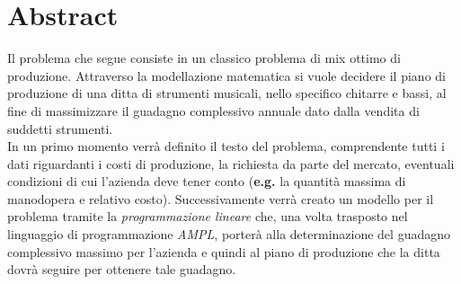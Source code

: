 \newpage
\section{Abstract}
Il problema che segue consiste in un classico problema di mix ottimo di produzione. Attraverso la modellazione matematica si vuole decidere il piano di produzione di una ditta di strumenti musicali, nello specifico chitarre e bassi, al fine di massimizzare il guadagno complessivo annuale dato dalla vendita di suddetti strumenti. \\ 
In un primo momento verrà definito il testo del problema, comprendente tutti i dati riguardanti i costi di produzione, la richiesta da parte del mercato, eventuali condizioni di cui l'azienda deve tener conto (\textbf{e.g.} la quantità massima di manodopera e relativo costo).
Successivamente verrà creato un modello per il problema tramite la \textit{programmazione lineare} che, una volta trasposto nel linguaggio di programmazione \textit{AMPL}, porterà alla determinazione del guadagno complessivo massimo per l'azienda e quindi al piano di produzione che la ditta dovrà seguire per ottenere tale guadagno.